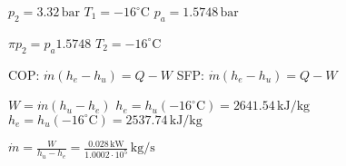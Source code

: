 \( p_2 = 3.32 \, \text{bar} \)  
\( T_1 = -16^\circ \text{C} \)  
\( p_a = 1.5748 \, \text{bar} \)  

\( \pi p_2 = p_a 1.5748 \)  
\( T_2 = -16^\circ \text{C} \)  

COP: \( \dot{m}(h_e - h_u) = Q - W \)  
SFP: \( \dot{m}(h_e - h_u) = Q - W \)  

\( W = \dot{m}(h_u - h_e) \)  
\( h_e = h_u(-16^\circ \text{C}) = 2641.54 \, \text{kJ/kg} \)  
\( h_e = h_u(-16^\circ \text{C}) = 2537.74 \, \text{kJ/kg} \)  

\( \dot{m} = \frac{W}{h_u - h_e} = \frac{0.028 \, \text{kW}}{1.0002 \cdot 10^5} \, \text{kg/s} \)